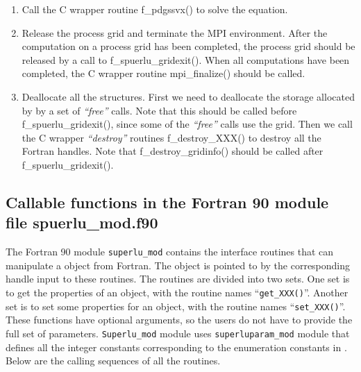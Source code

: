 \begin{enumerate}
\item Call the C wrapper routine \textsf{f\_pdgssvx()} to solve the equation.

\item Release the process grid and terminate the MPI environment.
After the computation on a process grid has been completed, the process grid
should be released by a call to \textsf{f\_spuerlu\_gridexit()}. When all
computations have been completed, the C wrapper routine
\textsf{mpi\_finalize()} should be called.

\item Deallocate all the structures. First we need to deallocate the storage
allocated by {\superlud} by a set of \emph{``free''} calls.
Note that this should be called
before \textsf{f\_spuerlu\_gridexit()}, since some of the \emph{``free''}
calls use the grid. Then we call the C wrapper \emph{``destroy''}
routines \textsf{f\_destroy\_XXX()} to destroy all the Fortran handles.
Note that \textsf{f\_destroy\_gridinfo()}
should be called after \textsf{f\_spuerlu\_gridexit()}.
\end{enumerate}

\subsection{Callable functions in the Fortran 90 module file
            \textsf{spuerlu\_mod.f90}}
The Fortran 90 module {\tt superlu\_mod} contains the interface
routines that can manipulate a {\superlud} object from Fortran.
The object is pointed to by the corresponding handle input to these routines.
The routines are divided into two sets. One set is to get the properties
of an object, with the routine names ``{\tt get\_XXX()}''. Another set is to
set some properties for an object, with the routine names ``{\tt set\_XXX()}''.
These functions have optional arguments, so the users do not have to provide
the full set of parameters. {\tt Superlu\_mod} module uses
{\tt superluparam\_mod} module that defines all the integer constants
corresponding to the enumeration constants in {\superlud}.
Below are the calling sequences of all the routines.

